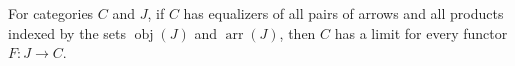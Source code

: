 For categories $C$ and $J$, if $C$ has equalizers of all pairs of arrows and all products indexed by the sets $\operatorname{obj}(J)$ and $\operatorname{arr}(J)$, then $C$ has a limit for every functor $F : J \to C$.
